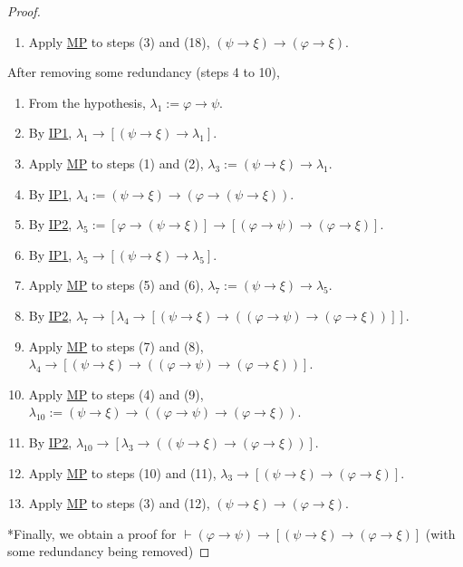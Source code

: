 \documentclass{treatise}
\begin{document}
\begin{proof}
\begin{enumerate}
    \item Apply \hyperref[HPL-R-MP]{MP} to steps (3) and (18), $(\psi \to \xi) \to (\varphi \to \xi)$.
\end{enumerate}
After removing some redundancy (steps 4 to 10),
\begin{enumerate}
    \item From the hypothesis, $\lambda_1 := \varphi \to \psi$.
    \item By \hyperref[HPL-A-IP1]{IP1}, $\lambda_1 \to [(\psi \to \xi) \to \lambda_1]$.
    \item Apply \hyperref[HPL-R-MP]{MP} to steps (1) and (2), $\lambda_3 := (\psi \to \xi) \to \lambda_1$.
    \\
    \item By \hyperref[HPL-A-IP1]{IP1}, $\lambda_4 := (\psi \to \xi) \to (\varphi \to (\psi \to \xi))$.
    \\
    \item By \hyperref[HPL-A-IP2]{IP2}, $\lambda_5 := [\varphi \to (\psi \to \xi)] \to [(\varphi \to \psi) \to (\varphi \to \xi)]$.
    \item By \hyperref[HPL-A-IP1]{IP1}, $\lambda_5 \to [(\psi \to \xi) \to \lambda_5]$.
    \item Apply \hyperref[HPL-R-MP]{MP} to steps (5) and (6), $\lambda_7 := (\psi \to \xi) \to\lambda_5$.
    \\
    \item By \hyperref[HPL-A-IP2]{IP2}, $\lambda_7 \to [\lambda_4 \to [(\psi \to \xi) \to ((\varphi \to \psi) \to (\varphi \to \xi))]]$.
    \item Apply \hyperref[HPL-R-MP]{MP} to steps (7) and (8), $\lambda_4 \to [(\psi \to \xi) \to ((\varphi \to \psi) \to (\varphi \to \xi))]$.
    \item Apply \hyperref[HPL-R-MP]{MP} to steps (4) and (9), $\lambda_{10} := (\psi \to \xi) \to ((\varphi \to \psi) \to (\varphi \to \xi))$.
    \\
    \item By \hyperref[HPL-A-IP2]{IP2}, $\lambda_{10} \to [\lambda_3 \to ((\psi \to \xi) \to (\varphi \to \xi))]$.
    \item Apply \hyperref[HPL-R-MP]{MP} to steps (10) and (11), $\lambda_3 \to [(\psi \to \xi) \to (\varphi \to \xi)]$.
    \item Apply \hyperref[HPL-R-MP]{MP} to steps (3) and (12), $(\psi \to \xi) \to (\varphi \to \xi)$.
\end{enumerate}
*Finally, we obtain a proof for $\vdash (\varphi \to \psi) \to [(\psi \to \xi) \to (\varphi \to \xi)]$ (with some redundancy being removed)

\end{proof}
\end{document}
